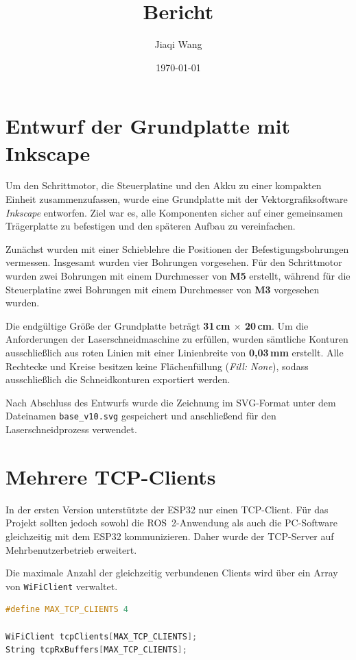 \documentclass[a4paper,12pt]{article}
\title{Bericht}
\author{Jiaqi Wang}
\date{\today}
\begin{document}
\maketitle

\section{Entwurf der Grundplatte mit Inkscape}

Um den Schrittmotor, die Steuerplatine und den Akku zu einer kompakten Einheit zusammenzufassen, wurde eine Grundplatte mit der Vektorgrafiksoftware \textit{Inkscape} entworfen. Ziel war es, alle Komponenten sicher auf einer gemeinsamen Trägerplatte zu befestigen und den späteren Aufbau zu vereinfachen.

Zunächst wurden mit einer Schieblehre die Positionen der Befestigungsbohrungen vermessen. Insgesamt wurden vier Bohrungen vorgesehen. Für den Schrittmotor wurden zwei Bohrungen mit einem Durchmesser von \textbf{M5} erstellt, während für die Steuerplatine zwei Bohrungen mit einem Durchmesser von \textbf{M3} vorgesehen wurden.

Die endgültige Größe der Grundplatte beträgt \textbf{31\,cm $\times$ 20\,cm}. Um die Anforderungen der Laserschneidmaschine zu erfüllen, wurden sämtliche Konturen ausschließlich aus roten Linien mit einer Linienbreite von \textbf{0,03\,mm} erstellt. Alle Rechtecke und Kreise besitzen keine Flächenfüllung (\textit{Fill: None}), sodass ausschließlich die Schneidkonturen exportiert werden.

Nach Abschluss des Entwurfs wurde die Zeichnung im SVG-Format unter dem Dateinamen \texttt{base\_v10.svg} gespeichert und anschließend für den Laserschneidprozess verwendet.



\section{Mehrere TCP-Clients}

In der ersten Version unterstützte der ESP32 nur einen TCP-Client. Für das Projekt sollten jedoch sowohl die ROS~2-Anwendung als auch die PC-Software gleichzeitig mit dem ESP32 kommunizieren. Daher wurde der TCP-Server auf Mehrbenutzerbetrieb erweitert.

Die maximale Anzahl der gleichzeitig verbundenen Clients wird über ein Array von \texttt{WiFiClient} verwaltet.

\begin{lstlisting}[language=C++]
#define MAX_TCP_CLIENTS 4

WiFiClient tcpClients[MAX_TCP_CLIENTS];
String tcpRxBuffers[MAX_TCP_CLIENTS];
\end{lstlisting}
\end{document}
